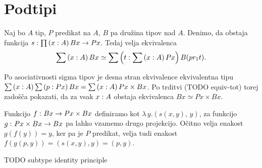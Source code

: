 \section{Podtipi}

\begin{trditev}
  \label{full-subtype}
  Naj bo \(A\) tip, \(P\) predikat na \(A\), \(B\) pa družina tipov nad \(A\). Denimo, da
  obstaja funkcija \(s : \prod \left( x : A \right) Bx \to Px\). Tedaj velja ekvivalenca
  \[\sum \left( x : A \right) Bx \simeq \sum \left( t : \sum \left( x : A \right) Px \right) B (pr_{1} t).\]
\end{trditev}

\begin{dokaz}
  Po asociativnosti sigma tipov je desna stran ekvivalence ekvivalentna tipu
  \(\sum \left( x : A \right) \sum \left( p : Px \right) Bx = \sum \left( x : A \right) Px \times Bx\).
  Po trditvi (TODO equiv-tot) torej zadošča pokazati, da za vsak \(x : A\)
  obstaja ekvivalenca \(Bx \simeq Px \times Bx\).

  Funkcijo \(f \,\colon Bx \to Px \times Bx\) definiramo kot
  \(\lambda \, y. \left(s(x,y),\, y\right)\), za funkcijo \(g \,\colon Px \times Bx \to Bx\) pa
  lahko vzamemo drugo projekcijo. Očitno velja enakost \(g(f(y)) = y\), ker pa je \(P\)
  predikat, velja tudi enakost
  \(f(g\left(p, y\right)) = \left(s(x, y), y\right) = \left(p, y\right)\).
\end{dokaz}

\begin{trditev}
  \label{subtype-id}
  TODO subtype identity principle
\end{trditev}

